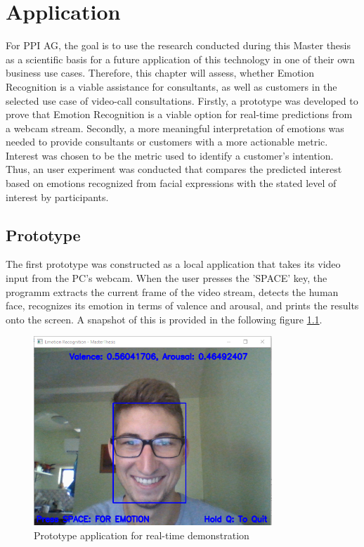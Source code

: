 
\chapter{Application}
For PPI AG, the goal is to use the research conducted during this Master thesis as a scientific basis for a future application of this technology in one of their own business use cases. Therefore, this chapter will assess, whether Emotion Recognition is a viable assistance for consultants, as well as customers in the selected use case of video-call consultations.
\newline\newline
Firstly, a prototype was developed to prove that Emotion Recognition is a viable option for real-time predictions from a webcam stream.
\newline\newline
Secondly, a more meaningful interpretation of emotions was needed to provide consultants or customers with a more actionable metric. Interest was chosen to be the metric used to identify a customer's intention. Thus, an user experiment was conducted that compares the predicted interest based on emotions recognized from facial expressions with the stated level of interest by participants.

\section{Prototype}
The first prototype was constructed as a local application that takes its video input from the PC's webcam. When the user presses the 'SPACE' key, the programm extracts the current frame of the video stream, detects the human face, recognizes its emotion in terms of valence and arousal, and prints the results onto the screen. A snapshot of this is provided in the following figure \ref{fig:PrototypeRealTime}. 

\begin{figure}[H]
  \begin{center}
  \includegraphics[angle=0, width=0.8\textwidth]{Figures/webcam_foto.PNG}
  \caption{Prototype application for real-time demonstration}
  \label{fig:PrototypeRealTime}
  \end{center}
\end{figure}

